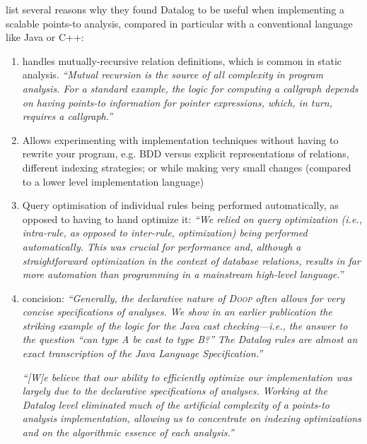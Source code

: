 
\citet{DBLP:conf/datalog/SmaragdakisB10} list several reasons why they found
Datalog to be useful when implementing a scalable points-to analysis, compared
in particular with a conventional language like Java or C++:

\begin{enumerate}
\item handles mutually-recursive relation definitions, which is common in static
  analysis. \emph{``Mutual recursion is the source of all complexity in program
    analysis. For a standard example, the logic for computing a callgraph
    depends on having points-to information for pointer expressions, which, in
    turn, requires a callgraph.''}~\citep{DBLP:conf/datalog/SmaragdakisB10}

\item Allows experimenting with implementation techniques without having to rewrite your program, e.g. BDD versus explicit representations of relations, different indexing strategies; or while making very small changes (compared to a lower level implementation language)

\item Query optimisation of individual rules being performed automatically, as
  opposed to having to hand optimize it: \emph{``We relied on query optimization
    (i.e., intra-rule, as opposed to inter-rule, optimization) being performed
    automatically. This was crucial for performance and, although a
    straightforward optimization in the context of database relations, results
    in far more automation than programming in a mainstream high-level
    language.''}

\item concision: \emph{``Generally, the declarative nature of \textsc{Doop}
  often allows for very concise specifications of analyses. We show in an
  earlier publication the striking example of the logic for the Java cast
  checking---i.e., the answer to the question “can type A be cast to type B?”
  The Datalog rules are almost an exact transcription of the Java
  Language Specification.''}

  \emph{``[W]e believe that our ability to efficiently optimize our
    implementation was largely due to the declarative specifications of
    analyses. Working at the Datalog level eliminated much of the artificial
    complexity of a points-to analysis implementation, allowing us to
    concentrate on indexing optimizations and on the algorithmic essence of each
    analysis.''}
\end{enumerate}

